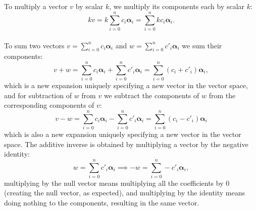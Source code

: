 \\\\
To multiply a vector $v$ by scalar $k$, we multiply its components each by scalar $k$:
$$
kv = k\sum_{i=0}^{n}c_{i}\bm{\alpha}_{i}=\sum_{i=0}^{n}kc_{i}\bm{\alpha}_{i}.
$$
\\
To sum two vectors $v=\sum_{i=0}^{n}c_{i}\bm{\alpha}_{i}$ and $w=\sum_{i=0}^{n}c'_{i}\bm{\alpha}_{i}$ we sum their components:
$$
v + w = \sum_{i=0}^{n}c_{i}\bm{\alpha}_{i}+\sum_{i=0}^{n}c'_{i}\bm{\alpha}_{i} = \sum_{i=0}^{n}(c_{i}+c'_{i})\bm{\alpha}_{i},
$$
which is a new expansion uniquely specifying a new vector in the vector space, and for subtraction of $w$ from $v$ we subtract the components of $w$ from the corresponding components of $v$:
$$
v - w = \sum_{i=0}^{n}c_{i}\bm{\alpha}_{i}-\sum_{i=0}^{n}c'_{i}\bm{\alpha}_{i} = \sum_{i=0}^{n}(c_{i}-c'_{i})\bm{\alpha}_{i}
$$
which is also a new expansion uniquely specifying a new vector in the vector space. The additive inverse is obtained by multiplying a vector by the negative identity:
$$
w=\sum_{i=0}^{n}c'_{i}\bm{\alpha}_{i} \implies -w=\sum_{i=0}^{n}-c'_{i}\bm{\alpha}_{i},
$$
multiplying by the null vector means multiplying all the coefficients by $0$ (creating the null vector, as expected), and multiplying by the identity means doing nothing to the components, resulting in the same vector.
